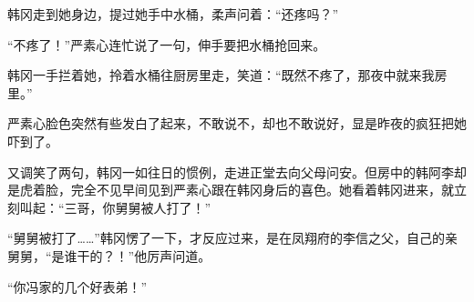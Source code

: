 韩冈走到她身边，提过她手中水桶，柔声问着：“还疼吗？”

“不疼了！”严素心连忙说了一句，伸手要把水桶抢回来。

韩冈一手拦着她，拎着水桶往厨房里走，笑道：“既然不疼了，那夜中就来我房里。”

严素心脸色突然有些发白了起来，不敢说不，却也不敢说好，显是昨夜的疯狂把她吓到了。

又调笑了两句，韩冈一如往日的惯例，走进正堂去向父母问安。但房中的韩阿李却是虎着脸，完全不见早间见到严素心跟在韩冈身后的喜色。她看着韩冈进来，就立刻叫起：“三哥，你舅舅被人打了！”

“舅舅被打了……”韩冈愣了一下，才反应过来，是在凤翔府的李信之父，自己的亲舅舅，“是谁干的？！”他厉声问道。

“你冯家的几个好表弟！”


